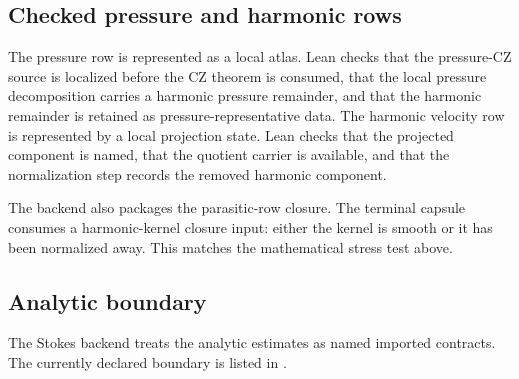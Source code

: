 \documentclass[11pt]{article}
\theoremstyle{plain}
\theoremstyle{definition}
\theoremstyle{remark}
\begin{document}
\subsection{Checked pressure and harmonic rows}
The pressure row is represented as a local atlas.  Lean checks that the
pressure-CZ source is localized before the CZ theorem is consumed, that the
local pressure decomposition carries a harmonic pressure remainder, and that
the harmonic remainder is retained as pressure-representative data.  The harmonic velocity row is
represented by a local projection state.  Lean checks that the projected
component is named, that the quotient carrier is available, and that the
normalization step records the removed harmonic component.

The backend also packages the parasitic-row closure.  The terminal capsule
consumes a harmonic-kernel closure input: either the kernel is smooth
or it has been normalized away.  This matches the mathematical stress test
above.

\subsection{Analytic boundary}
The Stokes backend treats the analytic estimates as named imported contracts.
The currently declared boundary is listed in
.
\end{document}
